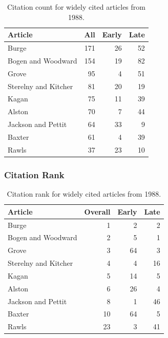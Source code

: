 \documentclass[
  10pt,
  letterpaper,
  DIV=11,
  numbers=noendperiod,
  twoside]{scrartcl}
\begin{document}
\begin{longtable}[]{@{}lrrr@{}}

\caption{\label{tbl-citation-count-1988}Citation count for widely cited
articles from 1988.}

\tabularnewline

\toprule\noalign{}
Article & All & Early & Late \\
\midrule\noalign{}
\endhead
\bottomrule\noalign{}
\endlastfoot
Burge & 171 & 26 & 52 \\
Bogen and Woodward & 154 & 19 & 82 \\
Grove & 95 & 4 & 51 \\
Sterelny and Kitcher & 81 & 20 & 19 \\
Kagan & 75 & 11 & 39 \\
Alston & 70 & 7 & 44 \\
Jackson and Pettit & 64 & 33 & 9 \\
Baxter & 61 & 4 & 39 \\
Rawls & 37 & 23 & 10 \\

\end{longtable}

\subsubsection*{Citation Rank}\label{sec-rank-1988}

\begin{longtable}[]{@{}lrrr@{}}

\caption{\label{tbl-citation-rank-1988}Citation rank for widely cited
articles from 1988.}

\tabularnewline

\toprule\noalign{}
Article & Overall & Early & Late \\
\midrule\noalign{}
\endhead
\bottomrule\noalign{}
\endlastfoot
Burge & 1 & 2 & 2 \\
Bogen and Woodward & 2 & 5 & 1 \\
Grove & 3 & 64 & 3 \\
Sterelny and Kitcher & 4 & 4 & 16 \\
Kagan & 5 & 14 & 5 \\
Alston & 6 & 26 & 4 \\
Jackson and Pettit & 8 & 1 & 46 \\
Baxter & 10 & 64 & 5 \\
Rawls & 23 & 3 & 41 \\

\end{longtable}
\end{document}
